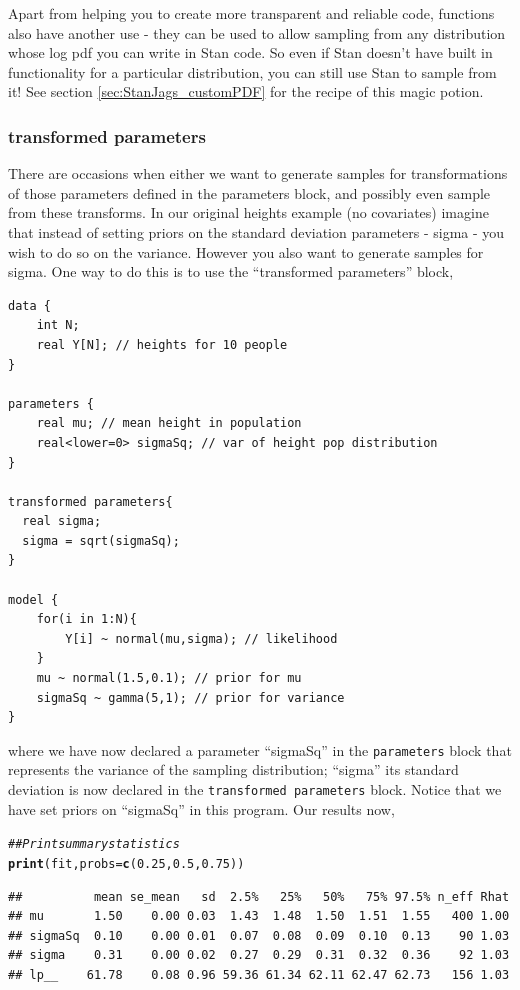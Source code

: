 \documentclass[11pt,fullpage]{book}
\makeatletter
\newenvironment{kframe}{%
	\def\at@end@of@kframe{}%
	\ifinner\ifhmode%
	\def\at@end@of@kframe{\end{minipage}}%
\begin{minipage}{\columnwidth}%
	\fi\fi%
	\def\FrameCommand##1{\hskip\@totalleftmargin \hskip-\fboxsep
		\colorbox{shadecolor}{##1}\hskip-\fboxsep
		\hskip-\linewidth \hskip-\@totalleftmargin \hskip\columnwidth}%
	\MakeFramed {\advance\hsize-\width
		\@totalleftmargin\z@ \linewidth\hsize
		\@setminipage}}%
{\par\unskip\endMakeFramed%
	\at@end@of@kframe}
\newcommand{\hlnum}[1]{\textcolor[rgb]{0.686,0.059,0.569}{#1}}%
\newcommand{\hlcom}[1]{\textcolor[rgb]{0.678,0.584,0.686}{\textit{#1}}}%
\newcommand{\hlstd}[1]{\textcolor[rgb]{0.345,0.345,0.345}{#1}}%
\newcommand{\hlkwc}[1]{\textcolor[rgb]{0.333,0.667,0.333}{#1}}%
\newcommand{\hlkwd}[1]{\textcolor[rgb]{0.737,0.353,0.396}{\textbf{#1}}}%
\newenvironment{knitrout}{}{} %
\makeatother
\begin{document}
Apart from helping you to create more transparent and reliable code, functions also have another use - they can be used to allow sampling from any distribution whose log pdf you can write in Stan code. So even if Stan doesn't have built in functionality for a particular distribution, you can still use Stan to sample from it! See section \ref{sec:StanJags_customPDF} for the recipe of this magic potion.

\subsubsection{transformed parameters}
There are occasions when either we want to generate samples for transformations of those parameters defined in the parameters block, and possibly even sample from these transforms. In our original heights example (no covariates) imagine that instead of setting priors on the standard deviation parameters - sigma - you wish to do so on the variance. However you also want to generate samples for sigma. One way to do this is to use the ``transformed parameters'' block,

\begin{verbatim}
data {
    int N;
    real Y[N]; // heights for 10 people
}

parameters {
    real mu; // mean height in population
    real<lower=0> sigmaSq; // var of height pop distribution
}

transformed parameters{
  real sigma;
  sigma = sqrt(sigmaSq);
}

model {
    for(i in 1:N){
        Y[i] ~ normal(mu,sigma); // likelihood
    }
    mu ~ normal(1.5,0.1); // prior for mu
    sigmaSq ~ gamma(5,1); // prior for variance
}
\end{verbatim}
where we have now declared a parameter ``sigmaSq'' in the \texttt{parameters} block that represents the variance of the sampling distribution; ``sigma'' its standard deviation is now declared in the \texttt{transformed parameters} block. Notice that we have set priors on ``sigmaSq'' in this program. Our results now,

\begin{knitrout}\small
		\color{fgcolor}\begin{kframe}
			\begin{alltt}
				\hlcom{## Print summary statistics}
				\hlkwd{print}\hlstd{(fit,}\hlkwc{probs} \hlstd{=} \hlkwd{c}\hlstd{(}\hlnum{0.25}\hlstd{,} \hlnum{0.5}\hlstd{,} \hlnum{0.75}\hlstd{))}
			\end{alltt}
			\begin{verbatim}
##          mean se_mean   sd  2.5%   25%   50%   75% 97.5% n_eff Rhat
## mu       1.50    0.00 0.03  1.43  1.48  1.50  1.51  1.55   400 1.00
## sigmaSq  0.10    0.00 0.01  0.07  0.08  0.09  0.10  0.13    90 1.03
## sigma    0.31    0.00 0.02  0.27  0.29  0.31  0.32  0.36    92 1.03
## lp__    61.78    0.08 0.96 59.36 61.34 62.11 62.47 62.73   156 1.03
			\end{verbatim}
		\end{kframe}
	\end{knitrout}
\end{document}

